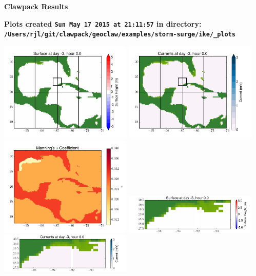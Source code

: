 \documentclass[11pt]{article}
\begin{document}
        \begin{center}{\Large\bf Clawpack Results}\vskip 5pt
        
        \bf Plots created {\tt Sun May 17 2015 at 21:11:57} in directory: \vskip 5pt
        \verb+/Users/rjl/git/clawpack/geoclaw/examples/storm-surge/ike/_plots+
        \end{center}
        \vskip 5pt
        \includegraphics[width=0.475\textwidth]{frame0000fig1.png}
\includegraphics[width=0.475\textwidth]{frame0000fig2.png}
\vskip 10pt 
\includegraphics[width=0.475\textwidth]{frame0000fig3.png}
\includegraphics[width=0.475\textwidth]{frame0000fig4.png}
\vskip 10pt 
\includegraphics[width=0.475\textwidth]{frame0000fig5.png}
\end{document}

